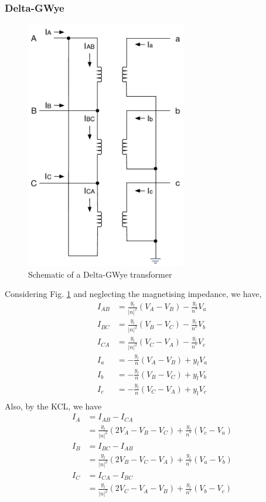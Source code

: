 \documentclass[11pt]{article}
\begin{document}
\subsubsection{Delta-GWye}
\begin{figure}
\begin{center}
\includegraphics[width=7cm]{DeltaGWye.pdf}
\caption{Schematic of a Delta-GWye transformer}
\label{FIG_DELTA_GWYE}
\end{center}
\end{figure}
Considering Fig. \ref{FIG_DELTA_GWYE} and neglecting the magnetising impedance, we have,
\begin{align}
I_{AB} &= \frac{y_l}{|n|^2}(V_A - V_B) - \frac{y_l}{n^*}V_a \\
I_{BC} &= \frac{y_l}{|n|^2}(V_B - V_C) - \frac{y_l}{n^*}V_b \\
I_{CA} &= \frac{y_l}{|n|^2}(V_C - V_A) - \frac{y_l}{n^*}V_c \\
I_a &= -\frac{y_l}{n}(V_A - V_B) + y_l V_a \\
I_b &= -\frac{y_l}{n}(V_B - V_C) + y_l V_b \\
I_c &= -\frac{y_l}{n}(V_C - V_A) + y_l V_c \\
\end{align}
Also, by the KCL, we have
\begin{align}
I_A &= I_{AB} - I_{CA} \\
&= \frac{y_l}{|n|^2}(2V_A - V_B - V_C) + \frac{y_l}{n^*}(V_c - V_a) \\
I_B &= I_{BC} - I_{AB} \\
&= \frac{y_l}{|n|^2}(2V_B - V_C - V_A) + \frac{y_l}{n^*}(V_a - V_b) \\
I_C &= I_{CA} - I_{BC} \\
&= \frac{y_l}{|n|^2}(2V_C - V_A - V_B) + \frac{y_l}{n^*}(V_b - V_c)
\end{align}
\end{document}
